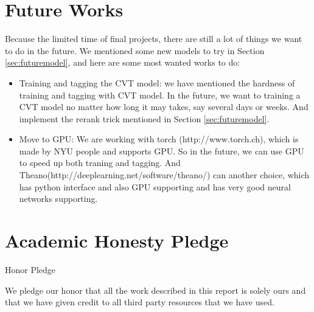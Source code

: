 \documentclass[11pt]{article}
\begin{document}
\section{Future Works}
Because the limited time of final projects, there are still a lot of things we want to do in the future. We mentioned some new models to try in Section \ref{sec:futuremodel}, and here are some most wanted works to do:
\begin{itemize}
\item Training and tagging the CVT model: we have mentioned the hardness of training and tagging with CVT model. In the future, we want to training a CVT model no matter how long it may takes, say several days or weeks. And implement the rerank trick mentioned  in Section \ref{sec:futuremodel}.
\item Move to GPU: We are working with torch (http://www.torch.ch), which is made by NYU people and supports GPU. So in the future, we can use GPU to speed up both traning and tagging. And Theano(http://deeplearning.net/software/theano/) can another choice, which has python interface and also GPU supporting and has very good neural networks supporting.
\end{itemize}

\section{Academic Honesty Pledge}

Honor Pledge

We pledge our honor that all the work described in this report is solely ours and
that we have given credit to all third party resources that we have used.

%
%
\end{document}
